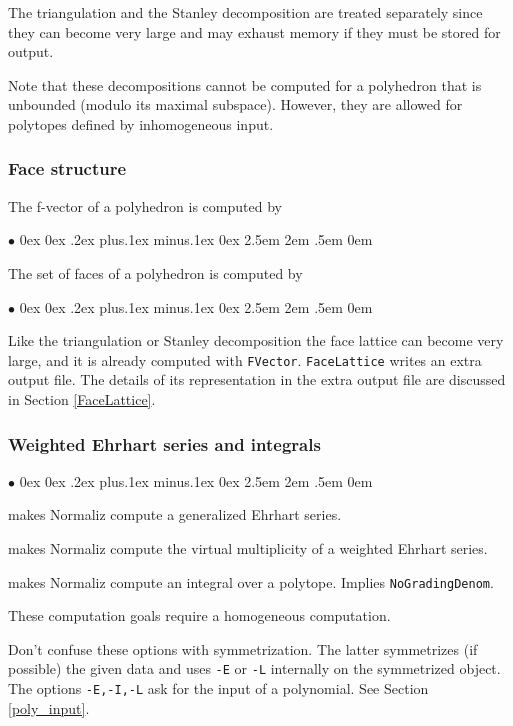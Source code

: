\documentclass[12pt,a4paper]{scrartcl}
\newcommand{\stdli}{ \topsep0ex \partopsep0ex %
\parsep.2ex plus.1ex minus.1ex \itemsep0ex%
\leftmargin2.5em \labelwidth2em \labelsep.5em \rightmargin0em}%
\renewenvironment{itemize}{\begin{list}{{$\bullet$}}{\stdli}}{\end{list}}
\theoremstyle{definition}
\def\itemtt[#1]{\item[\textbf{\ttt{#1}}]}
\def\ttt{\texttt}
\begin{document}
The triangulation and the Stanley decomposition are treated
separately since they can become very large and may exhaust
memory if they must be stored for output.

Note that these decompositions cannot be computed for a polyhedron that is unbounded (modulo its maximal subspace). However, they are allowed for polytopes defined by inhomogeneous input.

\subsubsection{Face structure}

The f-vector of a polyhedron is computed by
\begin{itemize}	
	\itemtt[FVector]
\end{itemize}

The set of faces of a polyhedron is computed by
\begin{itemize}	
	\itemtt[FaceLattice]
\end{itemize}
Like the triangulation or Stanley decomposition the face lattice can become very large, and it is already computed with \ttt{FVector}. \ttt{FaceLattice} writes an extra output file. The details of its representation in the extra output file are discussed in Section \ref{FaceLattice}.

\subsubsection{Weighted Ehrhart series and integrals}

\begin{itemize}
	
	\itemtt[WeightedEhrhartSeries, -E] makes Normaliz compute a generalized Ehrhart series.
	
	\itemtt[VirtualMultiplicity, -L] makes Normaliz compute the virtual multiplicity of a weighted Ehrhart series.
	
	\itemtt[Integral, -I] makes Normaliz compute an integral over a polytope. Implies \verb|NoGradingDenom|.	
\end{itemize}

These computation goals require a homogeneous computation.

Don't confuse these options with symmetrization. The latter symmetrizes (if possible) the given data and uses \verb|-E|  or \verb|-L| internally on the symmetrized object. The options \verb|-E,-I,-L| ask for the input of  a polynomial. See Section \ref{poly_input}.
\end{document}
